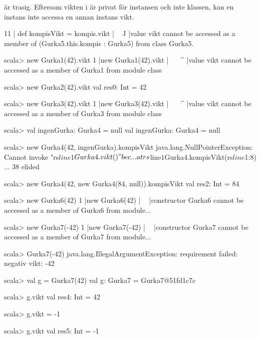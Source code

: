 \SOLUTION


\TaskSolved \what

\SubtaskSolved {} är trasig. Eftersom vikten i  är privat för instansen och inte klassen, kan en instans inte accessa en annan instans vikt.
\begin{REPL}
11 |  def kompisVikt = kompis.vikt
   |                   ^^^^^^^^^^^
   |value vikt cannot be accessed as a member of (Gurka5.this.kompis : Gurka5) from class Gurka5.
\end{REPL}


\SubtaskSolved
\begin{REPL}
scala> new Gurka1(42).vikt
1 |new Gurka1(42).vikt
  |^^^^^^^^^^^^^^^^^^^
  |value vikt cannot be accessed as a member of Gurka1 from module class

scala> new Gurka2(42).vikt
val res0: Int = 42

scala> new Gurka3(42).vikt
1 |new Gurka3(42).vikt
  |^^^^^^^^^^^^^^^^^^^
  |value vikt cannot be accessed as a member of Gurka3 from module class

scala> val ingenGurka: Gurka4 = null
val ingenGurka: Gurka4 = null

scala> new Gurka4(42, ingenGurka).kompisVikt
java.lang.NullPointerException: Cannot invoke "rs$line$1$Gurka4.vikt()" bec...
  at rs$line$1$Gurka4.kompisVikt(rs$line$1:8)
  ... 38 elided

scala> new Gurka4(42, new Gurka4(84, null)).kompisVikt
val res2: Int = 84

scala> new Gurka6(42)
1 |new Gurka6(42)
  |    ^^^^^^
  |constructor Gurka6 cannot be accessed as a member of Gurka6 from module...

scala> new Gurka7(-42)
1 |new Gurka7(-42)
  |    ^^^^^^
  |constructor Gurka7 cannot be accessed as a member of Gurka7 from module...

scala> Gurka7(-42)
java.lang.IllegalArgumentException: requirement failed: negativ vikt: -42

scala> val g = Gurka7(42)
val g: Gurka7 = Gurka7@51fd1c7c

scala> g.vikt
val res4: Int = 42

scala> g.vikt = -1

scala> g.vikt
val res5: Int = -1
\end{REPL}

\QUESTEND






